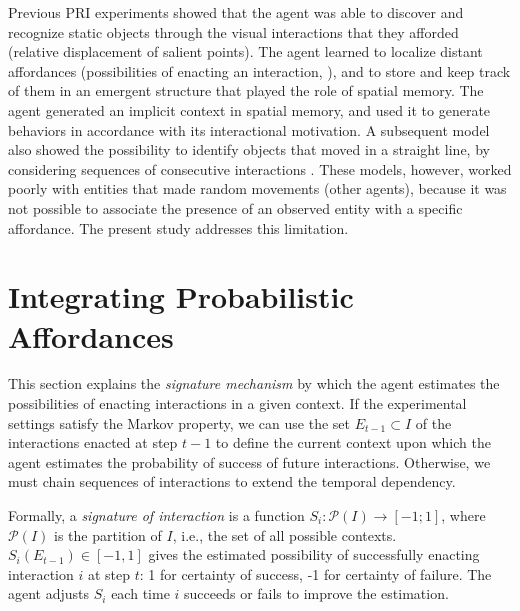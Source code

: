 \documentclass[conference]{IEEEtran}
\begin{document}
Previous PRI experiments showed that the agent was able to discover and recognize static objects through the visual interactions that they afforded (relative displacement of salient points). 
The agent learned to localize distant affordances (possibilities of enacting an interaction, \cite{gibson:affordances}), and to store and keep track of them in an emergent structure that played the role of spatial memory. 
The agent generated an implicit context in spatial memory, and used it to generate behaviors in accordance with its interactional motivation. 
A subsequent model also showed the possibility to identify objects that moved in a straight line, by considering sequences of consecutive interactions \cite{gay:dynamic}. 
These models, however, worked poorly with entities that made random movements (other agents), because it was not possible to associate the presence of an observed entity with a specific affordance. The present study addresses this limitation.



\section{Integrating Probabilistic Affordances}


This section explains the \textit{signature mechanism} by which the agent estimates the possibilities of enacting interactions in a given context. 
If the experimental settings satisfy the Markov property, we can use the set $E_{t-1} \subset I$ of the interactions enacted at step $t-1$ to define the current context upon which the agent estimates the probability of success of future interactions. Otherwise, we must chain sequences of interactions to extend the temporal dependency. 



Formally, a \textit{signature of interaction} is a function $S_i : \mathcal{P}(I) \rightarrow [-1;1]$, where $\mathcal{P}(I)$ is the partition of $I$, i.e., the set of all possible contexts.
$S_i(E_{t-1}) \in [-1, 1]$ gives the estimated possibility of successfully enacting interaction $i$ at step $t$: 1 for certainty of success, -1 for certainty of failure. 
The agent adjusts $S_i$ each time $i$ succeeds or fails to improve the estimation. %
\end{document}
